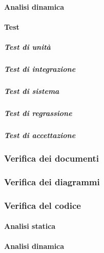 \paragraph{Analisi dinamica}

\paragraph{Test}

\subparagraph{Test di unità}
\subparagraph{Test di integrazione}
\subparagraph{Test di sistema}
\subparagraph{Test di regrassione}	
\subparagraph{Test di accettazione}

	
\subsubsection{Verifica dei documenti}

\subsubsection{Verifica dei diagrammi}

\subsubsection{Verifica del codice}
\paragraph{Analisi statica}
\paragraph{Analisi dinamica}
